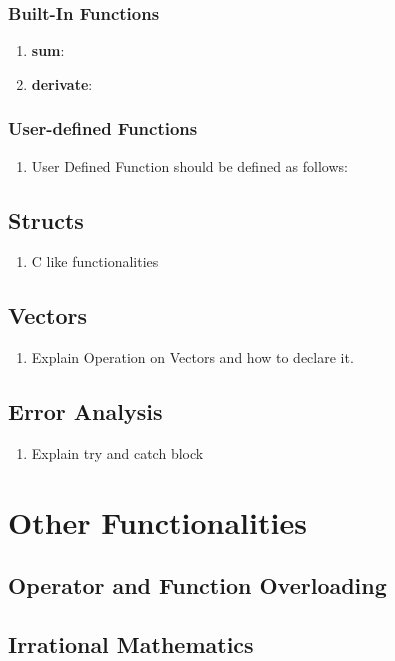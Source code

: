 \documentclass[12pt]{article}
\begin{document}
    \subsubsection{Built-In Functions}
    \begin{enumerate}
        \item \textbf{sum}:
        \item \textbf{derivate}:
    \end{enumerate}
    \subsubsection{User-defined Functions}
    \begin{enumerate}
        \item User Defined Function should be defined as follows:
    \end{enumerate}
    \subsection{Structs}
    \begin{enumerate}
        \item C like functionalities
    \end{enumerate}
    \subsection{Vectors}
    \begin{enumerate}
        \item Explain Operation on Vectors and how to declare it.
    \end{enumerate}
    \subsection{Error Analysis}
    \begin{enumerate}
        \item Explain try and catch block
    \end{enumerate}
    
    \section{Other Functionalities}
    \subsection{Operator and Function Overloading}
    \subsection{Irrational Mathematics}
\end{document}
